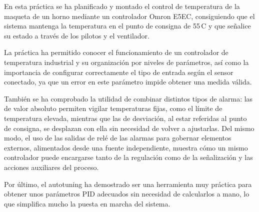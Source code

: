 \clearpage
{}

En esta práctica se ha planificado y montado el control de temperatura de la maqueta de un horno mediante un controlador Omron E5EC, consiguiendo que el sistema mantenga la temperatura en el punto de consigna de 55\,\textdegree C y que señalice su estado a través de los pilotos y el ventilador.

La práctica ha permitido conocer el funcionamiento de un controlador de temperatura industrial y su organización por niveles de parámetros, así como la importancia de configurar correctamente el tipo de entrada según el sensor conectado, ya que un error en este parámetro impide obtener una medida válida.

También se ha comprobado la utilidad de combinar distintos tipos de alarma: las de valor absoluto permiten vigilar temperaturas fijas, como el límite de temperatura elevada, mientras que las de desviación, al estar referidas al punto de consigna, se desplazan con ella sin necesidad de volver a ajustarlas. Del mismo modo, el uso de las salidas de relé de las alarmas para gobernar elementos externos, alimentados desde una fuente independiente, muestra cómo un mismo controlador puede encargarse tanto de la regulación como de la señalización y las acciones auxiliares del proceso.

Por último, el autotuning ha demostrado ser una herramienta muy práctica para obtener unos parámetros PID adecuados sin necesidad de calcularlos a mano, lo que simplifica mucho la puesta en marcha del sistema.
